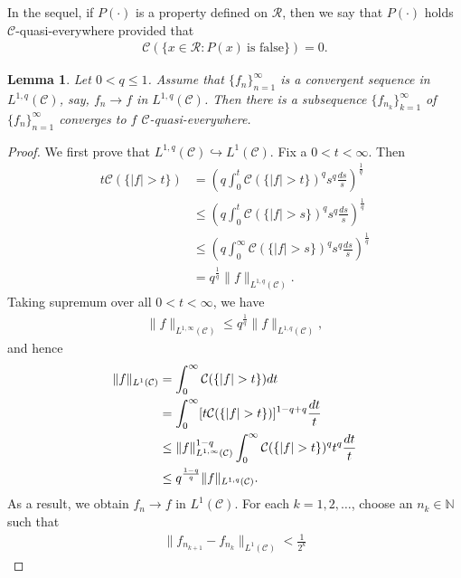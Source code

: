 \documentclass[10pt,reqno]{amsart}
\newtheorem{lemma}[theorem]{Lemma}
\numberwithin{equation}{section}
\begin{document}
In the sequel, if $P(\cdot)$ is a property defined on $\mathcal{R}$, then we say that $P(\cdot)$ holds $\mathcal{C}$-quasi-everywhere provided that 
\begin{align*}
\mathcal{C}(\{x\in\mathcal{R}:P(x)~\text{is false}\})=0.
\end{align*}

\begin{lemma}\label{quasi-normed-everywhere}
Let $0<q\leq 1$. Assume that $\{f_{n}\}_{n=1}^{\infty}$ is a convergent sequence in $L^{1,q}(\mathcal{C})$, say, $f_{n}\rightarrow f$ in $L^{1,q}(\mathcal{C})$. Then there is a subsequence $\{f_{n_{k}}\}_{k=1}^{\infty}$ of $\{f_{n}\}_{n=1}^{\infty}$ converges to $f$ $\mathcal{C}$-quasi-everywhere. 
\end{lemma}

\begin{proof}
We first prove that $L^{1,q}(\mathcal{C})\hookrightarrow L^{1}(\mathcal{C})$. Fix a $0<t<\infty$. Then
\begin{align*}
t\mathcal{C}(\{|f|>t\})&=\left(q\int_{0}^{t}\mathcal{C}(\{|f|>t\})^{q}s^{q}\frac{ds}{s}\right)^{\frac{1}{q}}\\
&\leq\left(q\int_{0}^{t}\mathcal{C}(\{|f|>s\})^{q}s^{q}\frac{ds}{s}\right)^{\frac{1}{q}}\\
&\leq\left(q\int_{0}^{\infty}\mathcal{C}(\{|f|>s\})^{q}s^{q}\frac{ds}{s}\right)^{\frac{1}{q}}\\
&=q^{\frac{1}{q}}\|f\|_{L^{1,q}(\mathcal{C})}.
\end{align*}
Taking supremum over all $0<t<\infty$, we have 
\begin{align*}
\|f\|_{L^{1,\infty}(\mathcal{C})}\leq q^{\frac{1}{q}}\|f\|_{L^{1,q}(\mathcal{C})},
\end{align*}
and hence 
\begin{align}
\|f\|_{L^{1}(\mathcal{C})}&=\int_{0}^{\infty}\mathcal{C}(\{|f|>t\})dt\notag\\
&=\int_{0}^{\infty}[t\mathcal{C}(\{|f|>t\})]^{1-q+q}\frac{dt}{t}\notag\\
&\leq\|f\|_{L^{1,\infty}(\mathcal{C})}^{1-q}\int_{0}^{\infty}\mathcal{C}(\{|f|>t\})^{q}t^{q}\frac{dt}{t}\notag\\
&\leq q^{\frac{1-q}{q}}\|f\|_{L^{1,q}(\mathcal{C})}.\label{use embedding}
\end{align}
As a result, we obtain $f_{n}\rightarrow f$ in $L^{1}(\mathcal{C})$. For each $k=1,2,\ldots$, choose an $n_{k}\in\mathbb{N}$ such that 
\begin{align*}
\|f_{n_{k+1}}-f_{n_{k}}\|_{L^{1}(\mathcal{C})}<\frac{1}{2^{k}}

\end{align*}
\end{proof}
\end{document}
